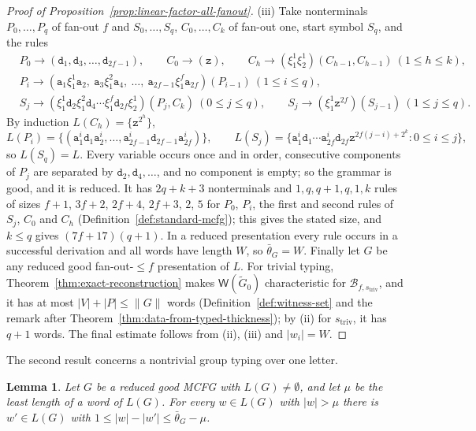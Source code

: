 \documentclass[11pt]{article}
\numberwithin{equation}{section}
\theoremstyle{plain}
\newtheorem{lemma}[theorem]{Lemma}
\theoremstyle{definition}
\theoremstyle{remark}
\newcommand{\Wit}{\mathsf{W}}
\begin{document}
\begin{proof}[Proof of Proposition~\ref{prop:linear-factor-all-fanout}]
(iii) Take nonterminals $P_0,\ldots,P_q$ of fan-out $f$ and $S_0,\ldots,S_q$,
$C_0,\ldots,C_k$ of fan-out one, start symbol $S_q$, and the rules
\[
\begin{aligned}
 &P_0\to(\mathtt d_1,\mathtt d_3,\ldots,\mathtt d_{2f-1}),\qquad
 C_0\to(\mathtt z),\qquad
 C_h\to(\xi_1^1\xi_2^1)(C_{h-1},C_{h-1})\ (1\le h\le k),\\
 &P_i\to(\mathtt a_1\xi_1^1\mathtt a_2,\ \mathtt a_3\xi_1^2\mathtt a_4,\ \ldots,\
 \mathtt a_{2f-1}\xi_1^f\mathtt a_{2f})(P_{i-1})\ (1\le i\le q),\\
 &S_j\to(\xi_1^1\mathtt d_2\xi_1^2\mathtt d_4\cdots\xi_1^f\mathtt d_{2f}\xi_2^1)(P_j,C_k)
 \ (0\le j\le q),\qquad
 S_j\to(\xi_1^1\mathtt z^{2f})(S_{j-1})\ (1\le j\le q).
\end{aligned}
\]
By induction $L(C_h)=\{\mathtt z^{2^h}\}$,
\[
 L(P_i)=\{(\mathtt a_1^i\mathtt d_1\mathtt a_2^i,\ldots,
 \mathtt a_{2f-1}^i\mathtt d_{2f-1}\mathtt a_{2f}^i)\},\qquad
 L(S_j)=\{\mathtt a_1^i\mathtt d_1\cdots\mathtt a_{2f}^i\mathtt d_{2f}
 \mathtt z^{2f(j-i)+2^k}:0\le i\le j\},
\]
so $L(S_q)=L$.  Every variable occurs once
and in order, consecutive components of $P_j$ are separated by
$\mathtt d_2,\mathtt d_4,\ldots$, and no component is empty; so the grammar is good,
and it is reduced.  It has $2q+k+3$ nonterminals and $1,q,q+1,q,1,k$ rules of
sizes $f+1$, $3f+2$, $2f+4$, $2f+3$, $2$, $5$ for $P_0$, $P_i$, the first and
second rules of $S_j$, $C_0$ and $C_h$ (Definition~\ref{def:standard-mcfg});
this gives the stated size, and $k\le q$ gives $(7f+17)(q+1)$.  In a reduced
presentation every rule occurs in a successful derivation and all words have
length $W$, so $\bar\theta_G=W$.  Finally let $G$ be any reduced good
fan-out-$\le f$ presentation of $L$.  For trivial typing,
Theorem~\ref{thm:exact-reconstruction} makes $\Wit(\widetilde G_0)$
characteristic for $\mathcal B_{f,s_{\mathrm{triv}}}$, and it has at most
$|V|+|P|\le\|G\|$ words (Definition~\ref{def:witness-set} and the remark after
Theorem~\ref{thm:data-from-typed-thickness}); by (ii) for $s_{\mathrm{triv}}$, it
has $q+1$ words.  The final estimate follows from (ii), (iii) and $|w_i|=W$.
\end{proof}

The second result concerns a nontrivial group typing over one letter.

\begin{lemma}\label{lem:app-lf-descent}
Let $G$ be a reduced good MCFG with $L(G)\ne\emptyset$, and let $\mu$ be the least
length of a word of $L(G)$.  For every $w\in L(G)$ with $|w|>\mu$ there is
$w'\in L(G)$ with $1\le|w|-|w'|\le\bar\theta_G-\mu$.
\end{lemma}
\end{document}
